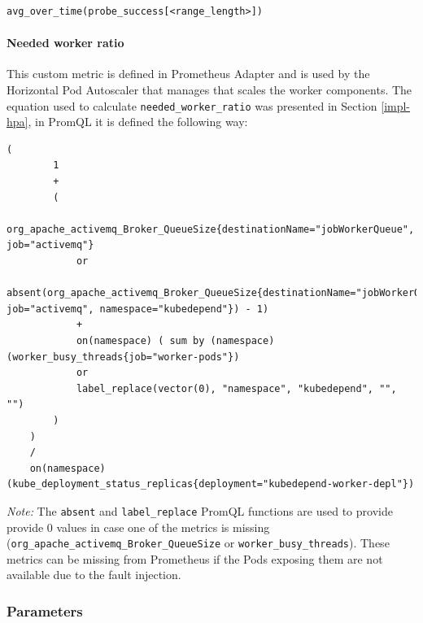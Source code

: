  \vspace{0.5cm}
 \begin{minipage}{\linewidth}
 	\begin{lstlisting}[caption={Availability defined in PromQL}, label={lst:promql-availability}]
 	avg_over_time(probe_success[<range_length>])\end{lstlisting}
 \end{minipage}

\paragraph{Needed worker ratio} This custom metric is defined in Prometheus Adapter and is used by the Horizontal Pod Autoscaler that manages that scales the worker components. The equation used to calculate \texttt{needed\_worker\_ratio} was presented in Section \ref{impl-hpa}, in PromQL it is defined the following way:

\vspace{0.5cm}
\begin{minipage}{\linewidth}
	\begin{lstlisting}[caption={\texttt{needed\_worker\_ratio} defined in PromQL}, label={lst:promql-availability}]
	(
		1
		+
		(
			org_apache_activemq_Broker_QueueSize{destinationName="jobWorkerQueue", job="activemq"}
			or
			absent(org_apache_activemq_Broker_QueueSize{destinationName="jobWorkerQueue", job="activemq", namespace="kubedepend"}) - 1)
			+
			on(namespace) ( sum by (namespace) (worker_busy_threads{job="worker-pods"})
			or
			label_replace(vector(0), "namespace", "kubedepend", "", "")
		)
	)
	/
	on(namespace) (kube_deployment_status_replicas{deployment="kubedepend-worker-depl"})\end{lstlisting}
\end{minipage}

\emph{Note:} The \texttt{absent} and \texttt{label\_replace} PromQL functions are used to provide provide 0 values in case one of the metrics is missing (\texttt{org\_apache\_activemq\_Broker\_QueueSize} or \texttt{worker\_busy\_threads}). These metrics can be missing from Prometheus if the Pods exposing them are not available due to the fault injection.


\subsubsection{Parameters}

